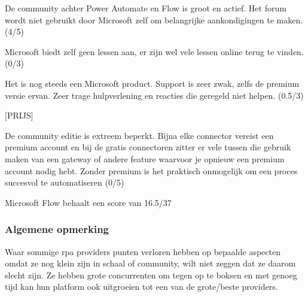 De community achter Power Automate en Flow is groot en actief. Het forum wordt niet gebruikt door Microsoft zelf om belangrijke aankondigingen te maken. (4/5)

Microsoft biedt zelf geen lessen aan, er zijn wel vele lessen online terug te vinden. (0/3)

Het is nog steeds een Microsoft product. Support is zeer zwak, zelfs de premium versie ervan. Zeer trage hulpverlening en reacties die geregeld niet helpen. (0.5/3)

[PRIJS]

De community editie is extreem beperkt. Bijna elke connector vereist een premium account en bij de gratis connectoren zitter er vele tussen die gebruik maken van een gateway of andere feature waarvoor je opnieuw een premium account nodig hebt. Zonder premium is het praktisch onmogelijk om een proces succesvol te automatiseren (0/5)

Microsoft Flow behaalt een score van 16.5/37


\subsubsection{Algemene opmerking}
Waar sommige \acrshort{rpa} providers punten verloren hebben op bepaalde aspecten omdat ze nog klein zijn in schaal of community, wilt niet zeggen dat ze daarom slecht zijn. Ze hebben grote concurrenten om tegen op te boksen en met genoeg tijd kan hun platform ook uitgroeien tot een van de grote/beste providers.

